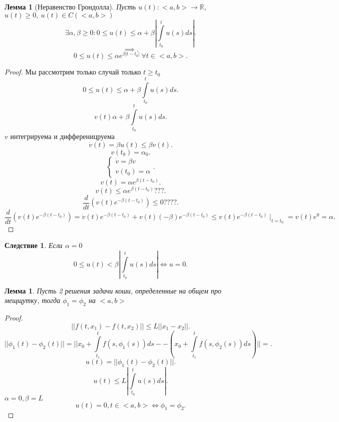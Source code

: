 \documentclass[14pt]{extarticle}
\newtheorem{corollary}{Следствие}[theorem]
\newtheorem{lemma}[theorem]{Лемма}
\begin{document}
 \begin{lemma}[Неравенство Грондолла]
     Пусть $u(t) : <a,b> \to \mathbb{R}$, $u(t) \ge  0, ~ u(t) \in C(<a,b>)$
     \[
     \exists  \alpha ,\beta \ge  0 : 0 \le  u(t)\le  \alpha + \beta| \int\limits_{t_0}^{t} u(s) ds|
     .\] 
     \[
         \implies
     .\] 
     \[
     0 \le  u(t) \le  \alpha e^{\beta |t - t_0|}~ \forall t \in <a,b>
     .\] 
 \end{lemma}
 \begin{proof}
    Мы рассмотрим только случай только $t \ge  t_0$ 
    \[
    0  \le  u(t) \le  \alpha + \beta \int\limits_{t_0}^{t} u(s) ds
    .\] 
    \[
    v(t) \alpha + \beta \int\limits_{t_0}^{t} u(s) ds
    .\] 
    $v$ интегрируема и дифференицруема
     \[
         \dot{v}(t) = \beta u(t)\le  \beta v(t)
    .\] 
    \[
    v(t_0) = \alpha_0
    .\] 
    \[
        \begin{cases}
            \dot{v} = \beta v\\
            v(t_0) = \alpha
        \end{cases}
    .\] 
    \[
    v(t) = \alpha e^{\beta(t - t_0)}
    .\] 
    \[
    v(t) \le \alpha e^{\beta (t - t_0)}???
    .\] 
    \[
    \frac{d}{dt} (v(t) e^{-\beta (t - t_0)}) \le 0????
    .\] 
    \[
        \frac{d}{dt} (v(t)e^{-\beta (t - t_0)}) = \dot{v} (t) e^{-\beta (t - t_0)} + v(t) (-\beta) e^{-\beta (t - t_0)}
        \le  v(t) e^{-\beta (t - t_0)} \mid_{t = t_0} = v(t)e^{0} = \alpha
    .\] 
 \end{proof}
 \begin{corollary}
     Если $\alpha = 0$ 
      \[
     0 \le  u(t) < \beta  |\int\limits_{t_0}^{t}   u(s) ds | \iff u = 0
     .\] 
 \end{corollary}
 \begin{lemma}
     Пусть 2 решения задачи коши, определенные на общем про мещщутку, тогда $\phi_1 = \phi_2$ на $<a,b>$
 \end{lemma}
 \begin{proof}
     \[
     || f(t,x_1) - f(t,x_2)| | \le  L ||x_1 -x_2||
     .\] 
     \[
     || \phi_{1} (t)  - \phi_2 (t)|| =  || x_0 + \int\limits_{t_1}^{t}  f(s,\phi_{1}(s))  ds -
     - (x_0 + \int\limits_{t_1}^{t} f(s,\phi_2 (s) ) ds )   || =
     .\] 
     \[
     u(t) = ||\phi_1(t) - \phi_2 (t) || 
     .\] 
     \[
     u(t) \le  L | \int\limits_{t_0}^{t} u(s)  ds |
     .\] 
     $\alpha = 0 , \beta = L$
      \[
     u(t) = 0 , t \in <a,b> \iff \phi_1 = \phi_2
     .\] 
 \end{proof}
\end{document}
